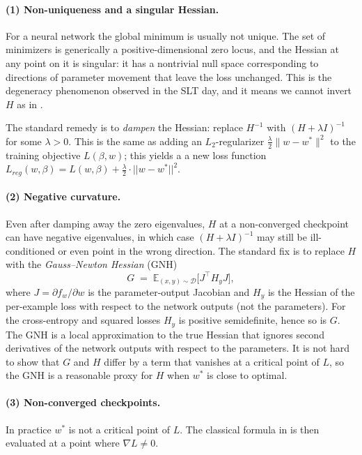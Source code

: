 \documentclass[11pt]{article}
\begin{document}
\paragraph{(1) Non-uniqueness and a singular Hessian.} For a neural network the global minimum is usually not unique. The set of minimizers is generically a positive-dimensional zero locus, and the Hessian at any point on it is singular: it has a nontrivial null space corresponding to directions of parameter movement that leave the loss unchanged. This is the degeneracy phenomenon observed in the SLT day, and it means we cannot invert $H$ as in .

The standard remedy is to \emph{dampen} the Hessian: replace $H^{-1}$ with $(H + \lambda I)^{-1}$ for some $\lambda > 0$. This is the same as adding an $L_2$-regularizer $\frac{\lambda}{2}\|w-w^*\|^2$ to the training objective $L(\beta,w)$; this yields a a new loss function $L_{reg}(w,\beta)= L(w,\beta)+\frac{\lambda}{2}\cdot ||w-w^*||^2$.



\paragraph{(2) Negative curvature.} Even after damping away the zero eigenvalues, $H$ at a non-converged checkpoint can have negative eigenvalues, in which case $(H + \lambda I)^{-1}$ may still be ill-conditioned or even point in the wrong direction. The standard fix is to replace $H$ with the \emph{Gauss--Newton Hessian} (GNH)
\[
  G \;=\; \mathbb{E}_{(x,y)\sim\mathcal{D}}\bigl[J^\top H_y J\bigr],
\]
where $J = \partial f_w/\partial w$ is the parameter-output Jacobian and $H_y$ is the Hessian of the per-example loss with respect to the network outputs (not the parameters). For the cross-entropy and squared losses $H_y$ is positive semidefinite, hence so is $G$. The GNH is a local approximation to the true Hessian that ignores second derivatives of the network outputs with respect to the parameters. It is not hard to show that $G$ and $H$ differ by a term that vanishes at a critical point of $L$, so the GNH is a reasonable proxy for $H$ when $w^*$ is close to optimal.

\paragraph{(3) Non-converged checkpoints.} In practice $w^*$ is not a critical point of $L$. The classical formula in  is then evaluated at a point where $\nabla L \neq 0$.
\end{document}
